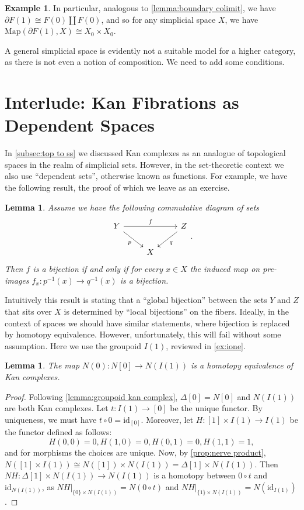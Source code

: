\documentclass[11pt, a4paper]{amsart}
\newcommand{\Map}{\mathrm{Map}}
\newcommand{\id}{\mathrm{id}}
\newtheorem{lemma}[equation]{Lemma}
\theoremstyle{definition}
\newtheorem{example}[equation]{Example}
\theoremstyle{remark}
\numberwithin{equation}{section}
\begin{document}
\begin{example} \label{ex:map boundary}
  In particular, analogous to \cref{lemma:boundary colimit}, we have $\partial F(1) \cong F(0) \coprod F(0)$, and so for any simplicial space $X$, we have $\Map(\partial F(1),X) \cong X_0 \times X_0$.
\end{example}


A general simplicial space is evidently not a suitable model for a higher category, as there is not even a notion of composition. We need to add some conditions.

\section{Interlude: Kan Fibrations as Dependent Spaces} \label{sec:kanfibrations}
In \cref{subsec:top to ss} we discussed Kan complexes as an analogue of topological spaces in the realm of simplicial sets. However, in the set-theoretic context we also use ``dependent sets'', otherwise known as functions. For example, we have the following result, the proof of which we leave as an exercise.

\begin{lemma}
  Assume we have the following commutative diagram of sets
  \[
  \begin{tikzcd}
   Y \arrow[rr, "f"] \arrow[dr, "p"'] & & Z \arrow[dl, "q"] \\ 
   & X 
  \end{tikzcd}.
  \] 
  Then $f$ is a bijection if and only if for every $x \in X$ the induced map on pre-images $f_x\colon p^{-1}(x) \to q^{-1}(x)$ is a bijection.
\end{lemma}

Intuitively this result is stating that a ``global bijection'' between the sets $Y$ and $Z$ that sits over $X$ is determined by ``local bijections'' on the fibers. Ideally, in the context of spaces we should have similar statements, where bijection is replaced by homotopy equivalence. However, unfortunately, this will fail without some assumption. Here we use the groupoid $I(1)$, reviewed in \cref{ex:ione}.

\begin{lemma} \label{lemma:i contractible}
 The map $N(0)\colon N[0] \to N(I(1))$ is a homotopy equivalence of Kan complexes.
\end{lemma}

\begin{proof}
  Following \cref{lemma:groupoid kan complex}, $\Delta[0] = N[0]$ and $N(I(1))$ are both Kan complexes. Let $t\colon I(1) \to [0]$ be the unique functor. By uniqueness, we must have $t \circ 0 = \id_{[0]}$. Moreover, let $H\colon [1] \times I(1) \to I(1)$ be the functor defined as follows:
    \[H(0,0) = 0, H(1,0) = 0, H(0,1) = 0, H(1,1) = 1,\]
  and for morphisms the choices are unique. Now, by \cref{prop:nerve product}, $N([1] \times I(1)) \cong N([1]) \times N(I(1)) = \Delta[1] \times N(I(1))$. Then $NH \colon \Delta[1] \times N(I(1)) \to N(I(1))$ is a homotopy between $0 \circ t$ and $\id_{N(I(1))}$, as $NH|_{\{ 0\} \times N(I(1))} = N(0 \circ t)$ and $NH|_{\{ 1\} \times N(I(1))} = N(\id_{I(1)})$. 
\end{proof}
\end{document}
